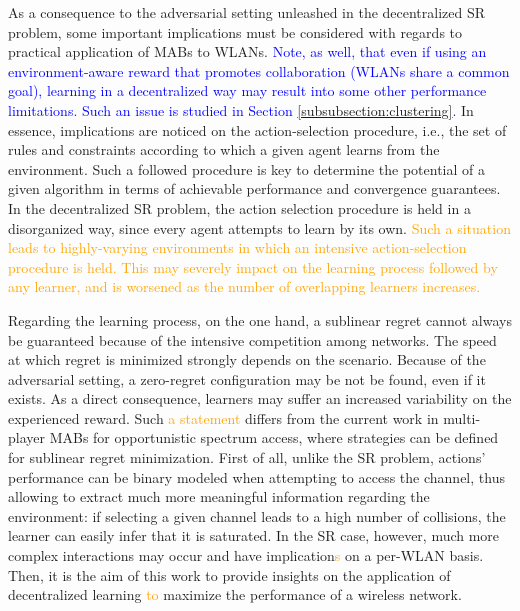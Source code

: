 \documentclass[preprint,12pt]{elsarticle}
\begin{document}
As a consequence to the adversarial setting unleashed in the decentralized SR problem, some important implications must be considered with regards to practical application of MABs to WLANs. \textcolor{blue}{Note, as well, that even if using an environment-aware reward that promotes collaboration (WLANs share a common goal), learning in a decentralized way may result into some other performance limitations. Such an issue is studied in Section \ref{subsubsection:clustering}.} In essence, implications are noticed on the action-selection procedure, i.e., the set of rules and constraints according to which a given agent learns from the environment. Such a followed procedure is key to determine the potential of a given algorithm in terms of achievable performance and convergence guarantees. In the decentralized SR problem, the action selection procedure is held in a disorganized way, since every agent attempts to learn by its own. \textcolor{orange}{Such a situation leads to highly-varying environments in which an intensive action-selection procedure is held. This may severely impact on the learning process followed by any learner, and is worsened as the number of overlapping learners increases.} %

Regarding the learning process, on the one hand, a sublinear regret cannot always be guaranteed because of the intensive competition among networks. The speed at which regret is minimized strongly depends on the scenario. Because of the adversarial setting, a zero-regret configuration may be not be found, even if it exists. As a direct consequence, learners may suffer an increased variability on the experienced reward. Such \textcolor{orange}{a statement} differs from the current work in multi-player MABs for opportunistic spectrum access, where strategies can be defined for sublinear regret minimization. First of all, unlike the SR problem, actions' performance can be binary modeled when attempting to access the channel, thus allowing to extract much more meaningful information regarding the environment: if selecting a given channel leads to a high number of collisions, the learner can easily infer that it is saturated. In the SR case, however, much more complex interactions may occur and have implication\textcolor{orange}{s} on a per-WLAN basis. Then, it is the aim of this work to provide insights on the application of decentralized learning \textcolor{orange}{to} maximize the performance of a wireless network.
\end{document}
